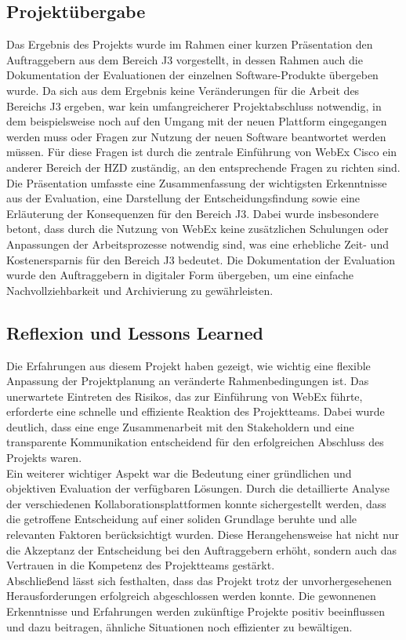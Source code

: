 \documentclass[ThesisDJ.tex]{subfiles}
\begin{document}
	\subsection{Projektübergabe}
	Das Ergebnis des Projekts wurde im Rahmen einer kurzen Präsentation den Auftraggebern aus dem Bereich J3 vorgestellt, in dessen Rahmen auch die Dokumentation der Evaluationen der einzelnen Software-Produkte übergeben wurde. Da sich aus dem Ergebnis keine Veränderungen für die Arbeit des Bereichs J3 ergeben, war kein umfangreicherer Projektabschluss notwendig, in dem beispielsweise noch auf den Umgang mit der neuen Plattform eingegangen werden muss oder Fragen zur Nutzung der neuen Software beantwortet werden müssen. Für diese Fragen ist durch die zentrale Einführung von WebEx Cisco ein anderer Bereich der HZD zuständig, an den entsprechende Fragen zu richten sind. \\
	Die Präsentation umfasste eine Zusammenfassung der wichtigsten Erkenntnisse aus der Evaluation, eine Darstellung der Entscheidungsfindung sowie eine Erläuterung der Konsequenzen für den Bereich J3. Dabei wurde insbesondere betont, dass durch die Nutzung von WebEx keine zusätzlichen Schulungen oder Anpassungen der Arbeitsprozesse notwendig sind, was eine erhebliche Zeit- und Kostenersparnis für den Bereich J3 bedeutet. Die Dokumentation der Evaluation wurde den Auftraggebern in digitaler Form übergeben, um eine einfache Nachvollziehbarkeit und Archivierung zu gewährleisten. \\
	
	\subsection{Reflexion und Lessons Learned}
	Die Erfahrungen aus diesem Projekt haben gezeigt, wie wichtig eine flexible Anpassung der Projektplanung an veränderte Rahmenbedingungen ist. Das unerwartete Eintreten des Risikos, das zur Einführung von WebEx führte, erforderte eine schnelle und effiziente Reaktion des Projektteams. Dabei wurde deutlich, dass eine enge Zusammenarbeit mit den Stakeholdern und eine transparente Kommunikation entscheidend für den erfolgreichen Abschluss des Projekts waren. \\
	Ein weiterer wichtiger Aspekt war die Bedeutung einer gründlichen und objektiven Evaluation der verfügbaren Lösungen. Durch die detaillierte Analyse der verschiedenen Kollaborationsplattformen konnte sichergestellt werden, dass die getroffene Entscheidung auf einer soliden Grundlage beruhte und alle relevanten Faktoren berücksichtigt wurden. Diese Herangehensweise hat nicht nur die Akzeptanz der Entscheidung bei den Auftraggebern erhöht, sondern auch das Vertrauen in die Kompetenz des Projektteams gestärkt. \\
	Abschließend lässt sich festhalten, dass das Projekt trotz der unvorhergesehenen Herausforderungen erfolgreich abgeschlossen werden konnte. Die gewonnenen Erkenntnisse und Erfahrungen werden zukünftige Projekte positiv beeinflussen und dazu beitragen, ähnliche Situationen noch effizienter zu bewältigen.
\end{document}
